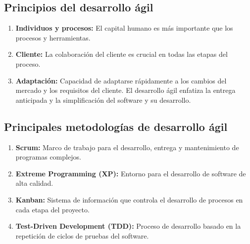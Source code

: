 \documentclass{article}
\begin{document}
\subsection{Principios del desarrollo ágil}
\begin{enumerate}
    \item \textbf{Individuos y procesos:} El capital humano es más importante que los procesos y herramientas.
    \item \textbf{Cliente:} La colaboración del cliente es crucial en todas las etapas del proceso. 
    \item \textbf{Adaptación:} Capacidad de adaptarse rápidamente a los cambios del mercado y los requisitos del cliente. El desarrollo ágil enfatiza la entrega anticipada y la simplificación del software y su desarrollo.
\end{enumerate}

\subsection{Principales metodologías de desarrollo ágil}
\begin{enumerate}
    \item \textbf{Scrum:} Marco de trabajo para el desarrollo, entrega y mantenimiento de programas complejos.
    \item \textbf{Extreme Programming (XP):} Entorno para el desarrollo de software de alta calidad.
    \item \textbf{Kanban:} Sistema de información que controla el desarrollo de procesos en cada etapa del proyecto.
    \item \textbf{Test-Driven Development (TDD):} Proceso de desarrollo basado en la repetición de ciclos de pruebas del software.
\end{enumerate}
\end{document}
